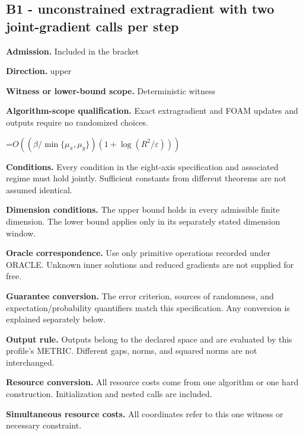 \documentclass[10pt,a4paper]{article}
\newcommand{\AtlasMath}[1]{\par\begingroup\centering\setbox0=\hbox{$\displaystyle #1$}\ifdim\wd0>1.4\linewidth\typeout{ATLAS WIDE FORMULA: \the\wd0}\fi\ifdim\wd0>\linewidth\resizebox{\linewidth}{!}{\box0}\else\box0\fi\par\endgroup}
\begin{document}
\subsection{B1 - unconstrained extragradient with two joint-gradient calls per step}


\textbf{Admission.} Included in the bracket



\textbf{Direction.} upper



\textbf{Witness or lower-bound scope.} Deterministic witness



\textbf{Algorithm-scope qualification.} Exact extragradient and FOAM updates and outputs require no randomized choices.



\AtlasMath{O((\beta/\min\{\mu_x,\mu_y\})(1+\log(R^2/\varepsilon)))}


\textbf{Conditions.} Every condition in the eight-axis specification and associated regime must hold jointly. Sufficient constants from different theorems are not assumed identical.



\textbf{Dimension conditions.} The upper bound holds in every admissible finite dimension. The lower bound applies only in its separately stated dimension window.



\textbf{Oracle correspondence.} Use only primitive operations recorded under ORACLE. Unknown inner solutions and reduced gradients are not supplied for free.



\textbf{Guarantee conversion.} The error criterion, sources of randomness, and expectation/probability quantifiers match this specification. Any conversion is explained separately below.



\textbf{Output rule.} Outputs belong to the declared space and are evaluated by this profile's METRIC. Different gaps, norms, and squared norms are not interchanged.



\textbf{Resource conversion.} All resource costs come from one algorithm or one hard construction. Initialization and nested calls are included.



\textbf{Simultaneous resource costs.} All coordinates refer to this one witness or necessary constraint.
\end{document}
